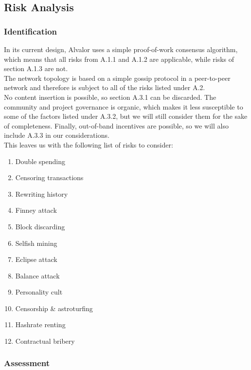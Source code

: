\documentclass[12pt,a4paper]{article}
\begin{document}
\subsection{Risk Analysis}

\subsubsection{Identification}

In its current design, Alvalor uses a simple proof-of-work consensus algorithm, which means that all risks from A.1.1 and A.1.2 are applicable, while risks of section A.1.3 are not.\\

The network topology is based on a simple gossip protocol in a peer-to-peer network and therefore is subject to all of the risks listed under A.2.\\

No content insertion is possible, so section A.3.1 can be discarded. The community and project governance is organic, which makes it less susceptible to some of the factors listed under A.3.2, but we will still consider them for the sake of completeness. Finally, out-of-band incentives are possible, so we will also include A.3.3 in our considerations.\\

This leaves us with the following list of risks to consider:
\begin{enumerate}
  \item Double spending
  \item Censoring transactions
  \item Rewriting history
  \item Finney attack
  \item Block discarding
  \item Selfish mining
  \item Eclipse attack
  \item Balance attack
  \item Personality cult
  \item Censorship \& astroturfing
  \item Hashrate renting
  \item Contractual bribery
\end{enumerate}

\subsubsection{Assessment}
\end{document}
